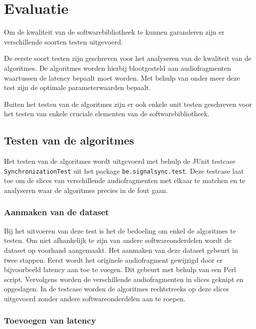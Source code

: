 \chapter{Evaluatie}
\label{evaluatie}

Om de kwaliteit van de softwarebibliotheek te kunnen garanderen zijn er verschillende soorten testen uitgevoerd. 

De eerste soort testen zijn geschreven voor het analyseren van de kwaliteit van de algoritmes. De algoritmes worden hierbij blootgesteld aan audiofragmenten waartussen de latency bepaalt moet worden. Met behulp van onder meer deze test zijn de optimale parameterwaarden bepaalt.

Buiten het testen van de algoritmes zijn er ook enkele unit testen geschreven voor het testen van enkele cruciale elementen van de softwarebibliotheek. 

\section{Testen van de algoritmes}
\label{algoritme-test}

Het testen van de algoritmes wordt uitgevoerd met behulp de JUnit testcase \texttt{SynchronizationTest} uit het package \texttt{be.signalsync.test}. Deze testcase laat toe om de slices van verschillende audiofragmenten met elkaar te matchen en te analyseren waar de algoritmes precies in de fout gaan.

\subsection{Aanmaken van de dataset}

Bij het uitvoeren van deze test is het de bedoeling om enkel de algoritmes te testen. Om niet afhankelijk te zijn van andere softwareonderdelen wordt de dataset op voorhand aangemaakt. Het aanmaken van deze dataset gebeurt in twee stappen. Eerst wordt het originele audiofragment gewijzigd door er bijvoorbeeld latency aan toe te voegen. Dit gebeurt met behulp van een Perl script. Vervolgens worden de verschillende audiofragmenten in slices geknipt en opgeslagen. In de testcase worden de algoritmes rechtstreeks op deze slices uitgevoerd zonder andere softwareonderdelen aan te roepen.

\subsection{Toevoegen van latency}
\label{latency-test}

